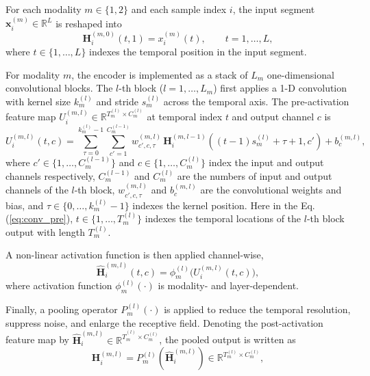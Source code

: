 \documentclass[a4paper]{cas-sc}
\begin{document}
For each modality $m \in \{1,2\}$ and each sample index $i$, the input segment $\mathbf{x}_i^{(m)} \in \mathbb{R}^{L}$ is reshaped into
\begin{equation}
\mathbf{H}^{(m,0)}_i(t,1) = x_i^{(m)}(t), \qquad t = 1,\ldots,L,
\label{eq:reshape}
\end{equation}
where $t \in \{1,\ldots,L\}$ indexes the temporal position in the input segment.

For modality $m$, the encoder is implemented as a stack of $L_m$ one-dimensional convolutional blocks. The $l$-th block ($l = 1,\ldots,L_m$) first applies a 1-D convolution with kernel size $k_m^{(l)}$ and stride $s_m^{(l)}$ across the temporal axis. The pre-activation feature map $U_i^{(m,l)}\in\mathbb{R}^{T_m^{(l)}\times C_m^{(l)}}$ at temporal index $t$ and output channel $c$ is
\begin{equation}
U^{(m,l)}_i(t,c)=\sum_{\tau=0}^{k_m^{(l)}-1}\sum_{c'=1}^{C_{m}^{(l-1)}} w^{(m,l)}_{c',c,\tau}\,\mathbf{H}^{(m,l-1)}_i((t-1)s_m^{(l)}+\tau+1, c') + b^{(m,l)}_c ,
\label{eq:conv_pre}
\end{equation}
where $c' \in \{1,\ldots,C_m^{(l-1)}\}$ and $c \in \{1,\ldots,C_m^{(l)}\}$ index the input and output channels respectively, $C_m^{(l-1)}$ and $C_m^{(l)}$ are the numbers of input and output channels of the $l$-th block, $w^{(m,l)}_{c',c,\tau}$ and $b^{(m,l)}_c$ are the convolutional weights and bias, and $\tau \in \{0,\ldots,k_m^{(l)}-1\}$ indexes the kernel position. Here in the Eq. (\ref{eq:conv_pre}), $t \in \{1,\ldots,T_m^{(l)}\}$ indexes the temporal locations of the $l$-th block output with length $T_m^{(l)}$. 


A non-linear activation function is then applied channel-wise,
\begin{equation}
\hat{\mathbf{H}}^{(m,l)}_i(t,c)
=
\phi_m^{(l)}\!\big(U^{(m,l)}_i(t,c)\big),
\label{eq:conv_nonlinear}
\end{equation}
where activation function $\phi_m^{(l)}(\cdot)$ is modality- and layer-dependent.

Finally, a pooling operator $P_m^{(l)}(\cdot)$ is applied to reduce the temporal resolution, suppress noise, and enlarge the receptive field. Denoting the post-activation feature map by $\hat{\mathbf{H}}_i^{(m,l)} \in \mathbb{R}^{\hat{T}_m^{(l)} \times C_m^{(l)}}$, the pooled output is written as
\begin{equation}
\mathbf{H}_i^{(m,l)}
=
P_m^{(l)}\!\left(\hat{\mathbf{H}}_i^{(m,l)}\right)
\in
\mathbb{R}^{T_m^{(l)} \times C_m^{(l)}},
\label{eq:pooling}
\end{equation}
\end{document}
